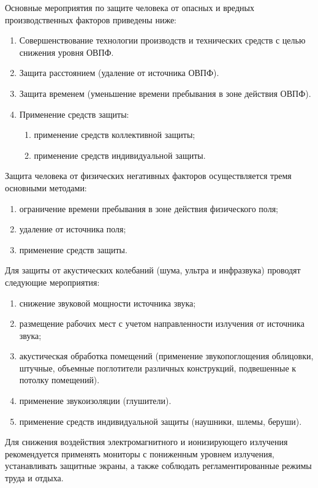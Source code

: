 Основные мероприятия по защите человека от опасных и вредных производственных факторов приведены ниже:

\begin{enumerate}[1.]
	\item Совершенствование технологии производств и технических средств с целью снижения уровня ОВПФ.
	\item Защита расстоянием (удаление от источника ОВПФ).
	\item Защита временем (уменьшение времени пребывания в зоне действия ОВПФ).
	\item Применение средств защиты:
	\begin{enumerate}
		\item применение средств коллективной защиты;
		\item применение средств индивидуальной защиты.
	\end{enumerate}
\end{enumerate}

Защита человека от физических негативных факторов осуществляется тремя основными методами:

\begin{enumerate}
	\item ограничение времени пребывания в зоне действия физического поля;
	\item удаление от источника поля;
	\item применение средств защиты.
\end{enumerate}

Для защиты от акустических колебаний (шума, ультра и инфразвука) проводят следующие мероприятия:

\begin{enumerate}
	\item снижение звуковой мощности источника звука;
	\item размещение рабочих мест с учетом направленности излучения от источника звука;
	\item акустическая обработка помещений (применение звукопоглощения облицовки, штучные, объемные поглотители различных конструкций, подвешенные к потолку помещений).
	\item применение звукоизоляции (глушители).
	\item применение средств индивидуальной защиты (наушники, шлемы, беруши).
\end{enumerate}

Для снижения воздействия электромагнитного и ионизирующего излучения рекомендуется применять мониторы с пониженным уровнем излучения, устанавливать защитные экраны, а также соблюдать регламентированные режимы труда и отдыха.

